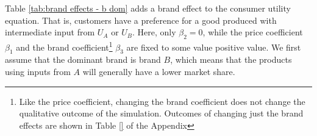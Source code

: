 \documentclass[12pt]{article}%
\begin{document}
Table \ref{tab:brand effects - b dom} adds a brand effect to the consumer utility equation. That is, customers have a preference for a good produced with intermediate input from $U_A$ or $U_B$. Here, only $\beta_2 = 0$, while the price coefficient $\beta_1$ and the brand coefficient\footnote{Like the price coefficient, changing the brand coefficient does not change the qualitative outcome of the simulation. Outcomes of changing just the brand effects are shown in Table \ref{} of the Appendix} $\beta_3$ are fixed to some value positive value. We first assume that the dominant brand is brand $B$, which means that the products using inputs from $A$ will generally have a lower market share.

\begin{table}[h]
  \centering
    \setlength{\tabcolsep}{2pt}
\end{table}
\end{document}
